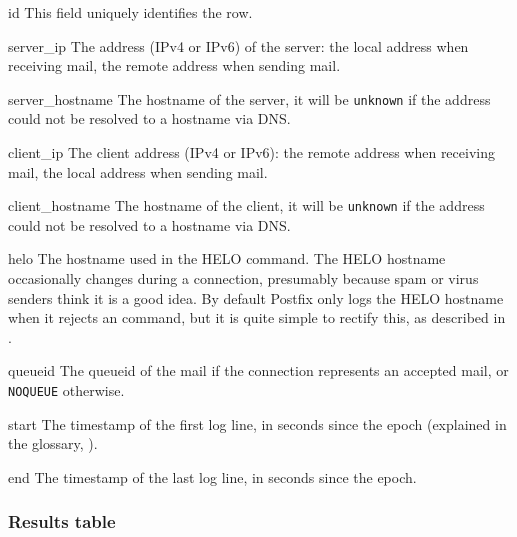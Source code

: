 \begin{eqlist}

    \item [id] This field uniquely identifies the row.

    \item [server\_ip] The \IP{} address (IPv4 or IPv6) of the server: the
        local address when receiving mail, the remote address when sending
        mail.

    \item [server\_hostname] The hostname of the server, it will be
        \texttt{unknown} if the \IP{} address could not be resolved to a
        hostname via DNS\@.

    \item [client\_ip] The client \IP{} address (IPv4 or IPv6): the remote
        address when receiving mail, the local address when sending mail.

    \item [client\_hostname] The hostname of the client, it will be
        \texttt{unknown} if the \IP{} address could not be resolved to a
        hostname via DNS\@.

    \item [helo] The hostname used in the HELO command.  The HELO hostname
        occasionally changes during a connection, presumably because spam
        or virus senders think it is a good idea.  By default Postfix only
        logs the HELO hostname when it rejects an \SMTP{} command, but it
        is quite simple to rectify this, as described in
        .

    \item [queueid] The queueid of the mail if the connection represents an
        accepted mail, or \texttt{NOQUEUE} otherwise.

    \item [start] The timestamp of the first log line, in seconds since the
        epoch (explained in the glossary, ).

    \item [end] The timestamp of the last log line, in seconds since the
        epoch.

\end{eqlist}

\subsubsection{Results table}

